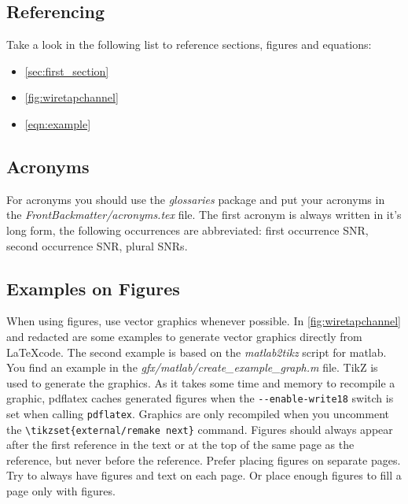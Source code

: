 \subsection{Referencing}

Take a look in the following list to reference sections, figures and equations:
\begin{itemize}
	\item \autoref{sec:first_section}
	\item \autoref{fig:wiretapchannel}
	\item \autoref{eqn:example}
\end{itemize}


\subsection{Acronyms}
For acronyms you should use the \emph{glossaries} package and put your acronyms
in the \emph{FrontBackmatter/acronyms.tex} file. The first acronym is always
written in it's long form, the following occurrences are abbreviated: first
occurrence \gls{SNR}, second occurrence \gls{SNR}, plural \glspl{SNR}.


\subsection{Examples on Figures}

\sloppy
When using figures, use vector graphics whenever possible. In
\autoref{fig:wiretapchannel} and redacted are some examples to
generate vector graphics directly from \LaTeX code. The second example is based
on the \emph{matlab2tikz} script for matlab. You find an example in the
\mbox{\emph{gfx/matlab/create\_example\_graph.m}} file. TikZ is used to generate
the graphics. As it takes some time and memory to recompile a graphic, pdflatex
caches generated figures when the \lstinline|--enable-write18| switch is set
when calling \lstinline|pdflatex|. Graphics are only recompiled when you
uncomment the \lstinline|\tikzset{external/remake next}| command. Figures should
always appear after the first reference in the text or at the top of the same
page as the reference, but never before the reference. Prefer placing figures on
separate pages. Try to always have figures and text on each page. Or place
enough figures to fill a page only with figures.

